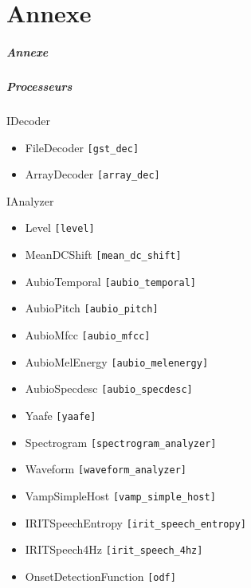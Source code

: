 \documentclass[10pt, final, hyperref, table]{beamer}
\begin{document}
\part{Annexe}
\begin{frame}
  \frametitle{Annexe}

\end{frame}

\begin{frame}\tiny
  \frametitle{Processeurs}
  \begin{minipage}{0.45\linewidth}

   \begin{block}{IDecoder}
      \begin{itemize}
      \item FileDecoder \texttt{[gst\_dec]}
      \item \alert{ArrayDecoder} \texttt{[array\_dec]}
      \end{itemize}
    \end{block}
    \begin{block}{IAnalyzer}
      \begin{itemize}
      \item Level \texttt{[level]}
      \item MeanDCShift \texttt{[mean\_dc\_shift]}
      \item AubioTemporal \texttt{[aubio\_temporal]}
      \item AubioPitch \texttt{[aubio\_pitch]}
      \item AubioMfcc \texttt{[aubio\_mfcc]}
        \item AubioMelEnergy \texttt{[aubio\_melenergy]}
      \item AubioSpecdesc \texttt{[aubio\_specdesc]}
      \item \alert{Yaafe} \texttt{[yaafe]}
      \item \alert{Spectrogram} \texttt{[spectrogram\_analyzer]}
      \item \alert{Waveform} \texttt{[waveform\_analyzer]}
      \item \alert{VampSimpleHost} \texttt{[vamp\_simple\_host]}
      \item \alert{IRITSpeechEntropy} \texttt{[irit\_speech\_entropy]}
      \item \alert{IRITSpeech4Hz} \texttt{[irit\_speech\_4hz]}
      \item \alert{OnsetDetectionFunction} \texttt{[odf]}
      \end{itemize}
    \end{block}
   \end{minipage} \hfill

\end{frame}
\end{document}
